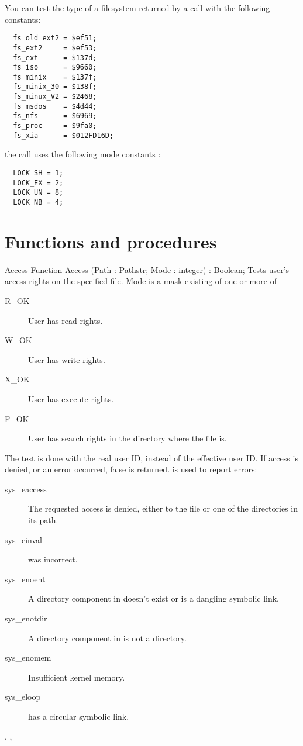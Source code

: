 You can test the type of a filesystem returned by a  call with
the following constants:
\begin{verbatim}
  fs_old_ext2 = $ef51;
  fs_ext2     = $ef53;
  fs_ext      = $137d;
  fs_iso      = $9660;
  fs_minix    = $137f;
  fs_minix_30 = $138f;
  fs_minux_V2 = $2468;
  fs_msdos    = $4d44;
  fs_nfs      = $6969;
  fs_proc     = $9fa0;
  fs_xia      = $012FD16D;
\end{verbatim}
the  call uses the following mode constants :
\begin{verbatim}
  LOCK_SH = 1;
  LOCK_EX = 2;
  LOCK_UN = 8;
  LOCK_NB = 4;
\end{verbatim}

\section{Functions and procedures}

\begin{function}{Access}
\Declaration
Function Access (Path : Pathstr; Mode : integer) : Boolean;
\Description
Tests user's access rights on the specified file. Mode is a mask existing of
one or more of
\begin{description}
\item[R\_OK] User has read rights.
\item[W\_OK] User has write rights.
\item[X\_OK] User has execute rights.
\item[F\_OK] User has search rights in the directory where the file is.
\end{description}
The test is done with the real user ID, instead of the effective user ID.
If access is denied, or an error occurred, false is returned.
\Errors
  is used to report errors:
\begin{description}
\item[sys\_eaccess] The requested access is denied, either to the file or one
of the directories in its path.
\item[sys\_einval]  was incorrect.
\item[sys\_enoent] A directory component in  doesn't exist or is a
dangling symbolic link.
\item[sys\_enotdir] A directory component in  is not a directory.
\item[sys\_enomem] Insufficient kernel memory.
\item[sys\_eloop]  has a circular symbolic link.
\end{description}

\SeeAlso
{}, ,  
\end{function}


